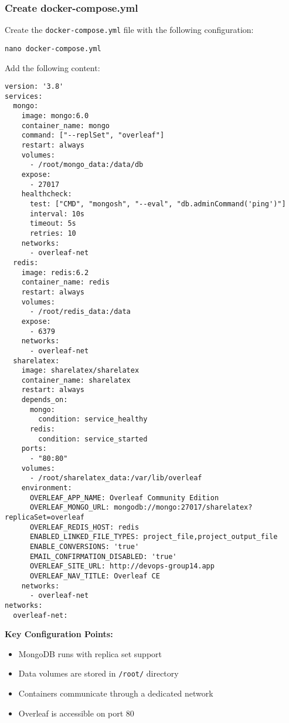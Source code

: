 \subsubsection{Create docker-compose.yml}

Create the \texttt{docker-compose.yml} file with the following configuration:

\begin{verbatim}
nano docker-compose.yml
\end{verbatim}

Add the following content:

\begin{verbatim}
version: '3.8'
services:
  mongo:
    image: mongo:6.0
    container_name: mongo
    command: ["--replSet", "overleaf"]
    restart: always
    volumes:
      - /root/mongo_data:/data/db
    expose:
      - 27017
    healthcheck:
      test: ["CMD", "mongosh", "--eval", "db.adminCommand('ping')"]
      interval: 10s
      timeout: 5s
      retries: 10
    networks:
      - overleaf-net
  redis:
    image: redis:6.2
    container_name: redis
    restart: always
    volumes:
      - /root/redis_data:/data
    expose:
      - 6379
    networks:
      - overleaf-net
  sharelatex:
    image: sharelatex/sharelatex
    container_name: sharelatex
    restart: always
    depends_on:
      mongo:
        condition: service_healthy
      redis:
        condition: service_started
    ports:
      - "80:80"
    volumes:
      - /root/sharelatex_data:/var/lib/overleaf
    environment:
      OVERLEAF_APP_NAME: Overleaf Community Edition
      OVERLEAF_MONGO_URL: mongodb://mongo:27017/sharelatex?replicaSet=overleaf
      OVERLEAF_REDIS_HOST: redis
      ENABLED_LINKED_FILE_TYPES: project_file,project_output_file
      ENABLE_CONVERSIONS: 'true'
      EMAIL_CONFIRMATION_DISABLED: 'true'
      OVERLEAF_SITE_URL: http://devops-group14.app
      OVERLEAF_NAV_TITLE: Overleaf CE
    networks:
      - overleaf-net
networks:
  overleaf-net:
\end{verbatim}

\textbf{Key Configuration Points:}
\begin{itemize}
    \item MongoDB runs with replica set support
    \item Data volumes are stored in \texttt{/root/} directory
    \item Containers communicate through a dedicated network
    \item Overleaf is accessible on port 80
\end{itemize}


